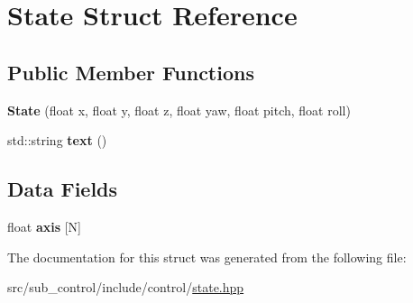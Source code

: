 \hypertarget{structState}{}\section{State Struct Reference}
\label{structState}
\subsection*{Public Member Functions}
\begin{DoxyCompactItemize}
\item 
\mbox{\label{structState_a4269fcddb236a0b67b3a450ec7a02d67}} 
{\bfseries State} (float x, float y, float z, float yaw, float pitch, float roll)
\item 
\mbox{\label{structState_aad7e94ab204532cbc2f121ee7e3c9ae0}} 
std\+::string {\bfseries text} ()
\end{DoxyCompactItemize}
\subsection*{Data Fields}
\begin{DoxyCompactItemize}
\item 
\mbox{\label{structState_a29b0a180a814444c808041a651c84427}} 
float {\bfseries axis} \mbox{[}N\mbox{]}
\end{DoxyCompactItemize}


The documentation for this struct was generated from the following file\+:\begin{DoxyCompactItemize}
\item 
src/sub\+\_\+control/include/control/\hyperlink{state_8hpp}{state.\+hpp}\end{DoxyCompactItemize}
